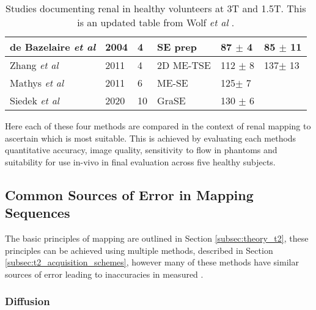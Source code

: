 \begin{table}[H]
\begin{adjustbox}{width=1.0\textwidth, center}
\begin{tabularx}{1.32\textwidth}{XXXXXX}
		\multicolumn{1}{l|}{de Bazelaire \textit{et al} \cite{de_bazelaire_mr_2004}} & \multicolumn{1}{l|}{2004} & \multicolumn{1}{l|}{4}           & \multicolumn{1}{l|}{SE \ttwo prep}   & \multicolumn{1}{l|}{87 $\pm$ 4}        & 85 $\pm$ 11        \\ \hline
		\multicolumn{1}{l|}{Zhang \textit{et al} \cite{zhang_reproducibility_2011}}  & \multicolumn{1}{l|}{2011} & \multicolumn{1}{l|}{4}           & \multicolumn{1}{l|}{2D ME-TSE}       & \multicolumn{1}{l|}{112 $\pm$ 8}       & 137$\pm$ 13        \\ \hline
		\multicolumn{1}{l|}{Mathys \textit{et al} \cite{mathys_t2_2011}}             & \multicolumn{1}{l|}{2011} & \multicolumn{1}{l|}{6}           & \multicolumn{1}{l|}{ME-SE}           & \multicolumn{1}{l|}{125$\pm$ 7}        &                    \\ \hline
		\multicolumn{1}{l|}{Siedek \textit{et al} \cite{siedek_magnetic_2020}}       & \multicolumn{1}{l|}{2020} & \multicolumn{1}{l|}{10}          & \multicolumn{1}{l|}{GraSE}           & \multicolumn{1}{l|}{130 $\pm$ 6}       &                   
	\end{tabularx}
	\end{adjustbox}
	\caption{Studies documenting renal \ttwo in healthy volunteers at 3T and 1.5T. This is an updated table from Wolf \textit{et al} \cite{wolf_magnetic_2018}.}
	\label{tab:t2_lit_values}
\end{table}

\newpage
Here each of these four methods are compared in the context of renal \ttwo mapping to ascertain which is most suitable. This is achieved by evaluating each methods quantitative accuracy, image quality, sensitivity to flow in phantoms and suitability for use in-vivo in final evaluation across five healthy subjects.

\subsection{Common Sources of Error in \ttwo Mapping Sequences}
The basic principles of \ttwo mapping are outlined in Section \ref{subsec:theory_t2}, these principles can be achieved using multiple methods, described in Section \ref{subsec:t2_acquisition_schemes}, however many of these methods have similar sources of error leading to inaccuracies in measured \ttwo. 

\subsubsection{Diffusion}

